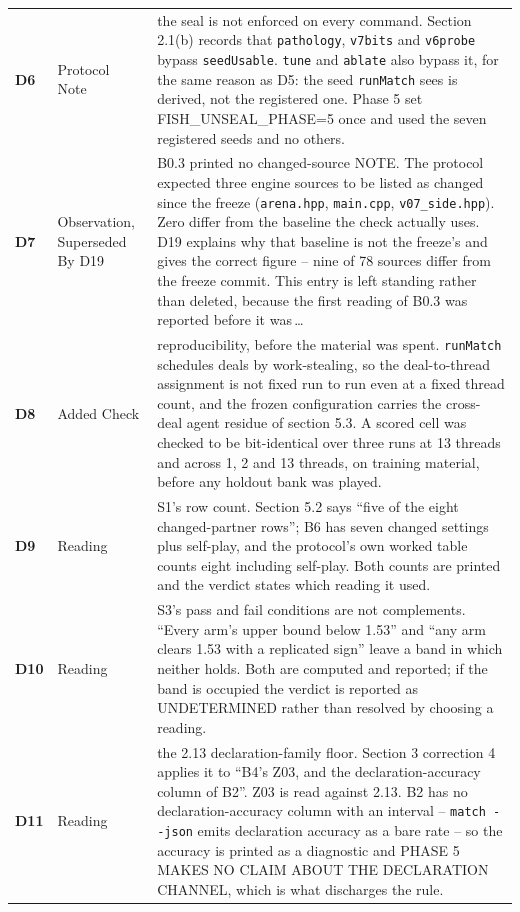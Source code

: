 \begin{xltabular}{\linewidth}{@{}l l L@{}}
\textbf{D6} & Protocol Note & the seal is not enforced on every command. Section 2.1(b) records that \texttt{pathology}, \texttt{v7bits} and \texttt{v6probe} bypass \texttt{seedUsable}. \texttt{tune} and \texttt{ablate} also bypass it, for the same reason as D5: the seed \texttt{runMatch} sees is derived, not the registered one. Phase 5 set FISH\_UNSEAL\_PHASE=5 once and used the seven registered seeds and no others. \\
\textbf{D7} & Observation, Superseded By D19 & B0.3 printed no changed-source NOTE. The protocol expected three engine sources to be listed as changed since the freeze (\texttt{arena.hpp}, \texttt{main.cpp}, \texttt{v07\_side.hpp}). Zero differ from the baseline the check actually uses. D19 explains why that baseline is not the freeze's and gives the correct figure -- nine of 78 sources differ from the freeze commit. This entry is left standing rather than deleted, because the first reading of B0.3 was reported before it was\,\ldots \\
\textbf{D8} & Added Check & reproducibility, before the material was spent. \texttt{runMatch} schedules deals by work-stealing, so the deal-to-thread assignment is not fixed run to run even at a fixed thread count, and the frozen configuration carries the cross-deal agent residue of section 5.3. A scored cell was checked to be bit-identical over three runs at 13 threads and across 1, 2 and 13 threads, on training material, before any holdout bank was played. \\
\textbf{D9} & Reading & S1's row count. Section 5.2 says ``five of the eight changed-partner rows''; B6 has seven changed settings plus self-play, and the protocol's own worked table counts eight including self-play. Both counts are printed and the verdict states which reading it used. \\
\textbf{D10} & Reading & S3's pass and fail conditions are not complements. ``Every arm's upper bound below 1.53'' and ``any arm clears 1.53 with a replicated sign'' leave a band in which neither holds. Both are computed and reported; if the band is occupied the verdict is reported as UNDETERMINED rather than resolved by choosing a reading. \\
\textbf{D11} & Reading & the 2.13 declaration-family floor. Section 3 correction 4 applies it to ``B4's Z03, and the declaration-accuracy column of B2''. Z03 is read against 2.13. B2 has no declaration-accuracy column with an interval -- \texttt{match -{}-json} emits declaration accuracy as a bare rate -- so the accuracy is printed as a diagnostic and PHASE 5 MAKES NO CLAIM ABOUT THE DECLARATION CHANNEL, which is what discharges the rule. \\

\end{xltabular}
